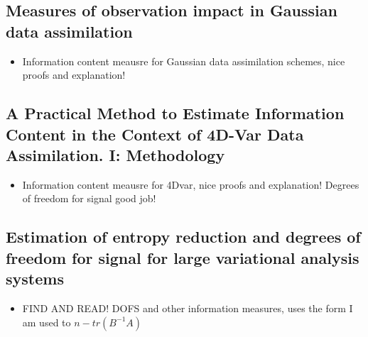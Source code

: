 \documentclass[11pt]{article}
\begin{document}
\subsection*{Measures of observation impact in Gaussian data assimilation \cite{fowler2011measures}}
\begin{itemize}
\item Information content meausre for Gaussian data assimilation schemes, nice proofs and explanation!
\end{itemize}


\subsection*{A Practical Method to Estimate Information Content in the Context of 4D-Var Data Assimilation. I: Methodology \cite{sandu2012practical}}
\begin{itemize}
\item Information content meausre for 4Dvar, nice proofs and explanation! Degrees of freedom for signal good job!
\end{itemize}


\subsection*{Estimation of entropy reduction and degrees of freedom for signal for large variational analysis systems \cite{fisher2003estimation}}
\begin{itemize}
\item FIND AND READ! DOFS and other information measures, uses the form I am used to $n - tr(B^{-1}A)$
\end{itemize}


{}

\end{document}
